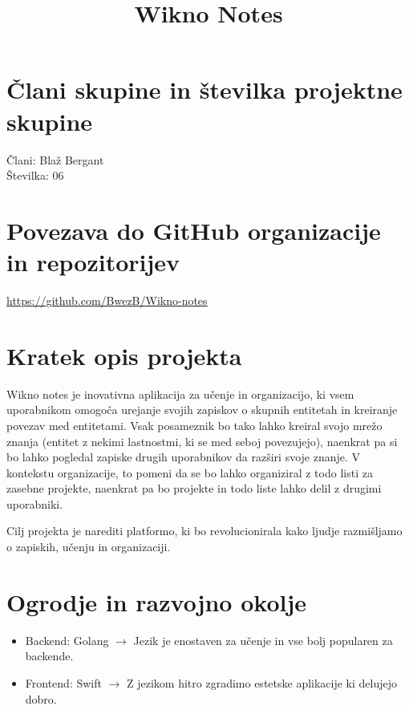 \documentclass{article}
\title{Wikno Notes}
\date{}
\begin{document}
\maketitle

\section{Člani skupine in številka projektne skupine}
Člani: Blaž Bergant \\
Številka: 06

\section{Povezava do GitHub organizacije in repozitorijev}
\url{https://github.com/BwezB/Wikno-notes}

\section{Kratek opis projekta}
Wikno notes je inovativna aplikacija za učenje in organizacijo, ki vsem uporabnikom omogoča urejanje svojih zapiskov o skupnih entitetah in kreiranje povezav med entitetami. Vsak posameznik bo tako lahko kreiral svojo mrežo znanja (entitet z nekimi lastnostmi, ki se med seboj povezujejo), naenkrat pa si bo lahko pogledal zapiske drugih uporabnikov da razširi svoje znanje. V kontekstu organizacije, to pomeni da se bo lahko organiziral z todo listi za zasebne projekte, naenkrat pa bo projekte in todo liste lahko delil z drugimi uporabniki. 

Cilj projekta je narediti platformo, ki bo revolucionirala kako ljudje razmišljamo o zapiskih, učenju in organizaciji.

\section{Ogrodje in razvojno okolje}
\begin{itemize}
    \item Backend: Golang $\rightarrow$ Jezik je enostaven za učenje in vse bolj popularen za backende.
    \item Frontend: Swift $\rightarrow$ Z jezikom hitro zgradimo estetske aplikacije ki delujejo dobro. 
\end{itemize}
\end{document}
